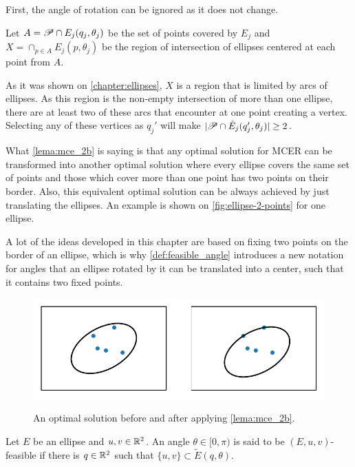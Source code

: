 \begin{demonstracao}
	First, the angle of rotation can be ignored as it does not change.
	
	Let $A=\mathscr{P} \cap E_j(q_j, \theta_j)$ be the set of points covered by $E_j$ and $X=\cap_{p \in A}E_j(p, \theta_j)$ be the region of intersection of ellipses centered at each point from $A$.

	As it was shown on \autoref{chapter:ellipses}, $X$ is a region that is limited by arcs of ellipses. As this region is the non-empty intersection of more than one ellipse, there are at least two of these arcs that encounter at one point creating a vertex. Selecting any of these vertices as $q_j'$ will make $|\mathscr{P} \cap \tilde{E}_j(q_j', \theta_j)| \ge 2$.
	
\end{demonstracao}

What \autoref{lema:mce_2b} is saying is that any optimal solution for MCER can be transformed into another optimal solution where every ellipse covers the same set of points and those which cover more than one point has two points on their border. Also, this equivalent optimal solution can be always achieved by just translating the ellipses. An example is shown on \autoref{fig:ellipse-2-points} for one ellipse.

A lot of the ideas developed in this chapter are based on fixing two points on the border of an ellipse, which is why \autoref{def:feasible_angle} introduces a new notation for angles that an ellipse rotated by it can be translated into a center, such that it contains two fixed points. 

\begin{figure}[H]
	\centering
	\caption{An optimal solution before and after applying \autoref{lema:mce_2b}.}
	\includegraphics{tex/figures/scripts/ellipse-2-points}
	\fautor
	\label{fig:ellipse-2-points}
\end{figure}

\begin{definicao}\label{def:feasible_angle}
	Let $E$ be an ellipse and $u, v \in \mathbb{R}^2$. An angle $\theta \in [0, \pi)$ is said to be $(E, u, v)$-feasible if there is $q \in \mathbb{R}^2$ such that $\{u, v\} \subset \tilde{E}(q, \theta)$.
\end{definicao}

